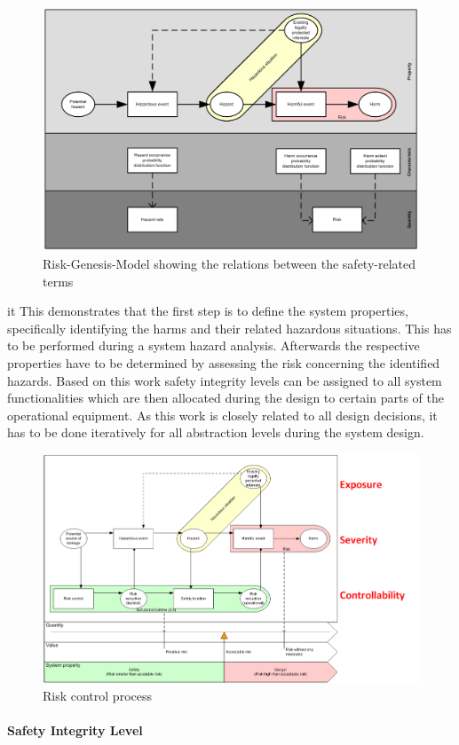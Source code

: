 \documentclass{template/openetcs_report}
\begin{document}
\begin{figure}[htbp]
\centering
\includegraphics[width=0.7\linewidth]{bld_2013-06-19_Risiko-Genese-Modell-eng-2-0_jw}
\caption{Risk-Genesis-Model showing the relations between the safety-related terms \cite{Schnieder.2010}}
\label{fig:Risiko-Genese-Modell-eng}
\end{figure}
it
This demonstrates that the first step is to define the system properties, specifically identifying the harms and their related hazardous situations. This has to be performed during a system hazard analysis. Afterwards the respective properties have to be determined by assessing the risk concerning the identified hazards. Based on this work safety integrity levels can be assigned to all system functionalities which are then allocated during the design to certain parts of the operational equipment. As this work is closely related to all design decisions, it has to be done iteratively for all abstraction levels during the system design. 

\begin{figure}[htbp]
\centering
\includegraphics[width=0.7\linewidth]{bld_2013-06-19_Risk-control-modell_1-0_jw}
\caption{Risk control process \cite{Schnieder.2013}}
\label{fig:Risk-control-modell-eng}
\end{figure}

\paragraph{Safety Integrity Level}
\end{document}
